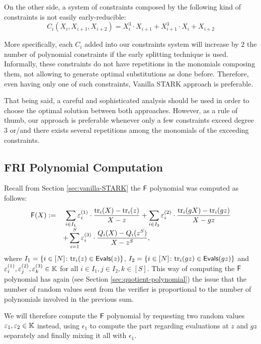 \begin{example}
On the other side, a system of constraints composed by the following kind of constraints is not easily early-reducible:
\[
C_i(X_i, X_{i+1}, X_{i+2}) = X_i^3 \cdot X_{i+1} + X_{i+1}^3 \cdot X_i + X_{i+2}
\]

More specifically, each $C_i$ added into our constraints system will increase by $2$ the number of polynomial constraints if the early splitting technique is used. Informally, these constraints do not have repetitions in the monomials composing them, not allowing to generate optimal substitutions as done before. Therefore, even having only one of such constraints, Vanilla STARK approach is preferable.

That being said, a careful and sophisticated analysis should be used in order to choose the optimal solution between both approaches. However, as a rule of thumb, our approach is preferable whenever only a few constraints exceed degree $3$ or/and there exists several repetitions among the monomials of the exceeding constraints.
 \end{example} 


\subsection{FRI Polynomial Computation}\label{sec:computing-polynomials}

Recall from Section \ref{sec:vanilla-STARK} the $\textsf{F}$ polynomial was computed as follows:
\begin{align*}
\begin{array}{rl}
\textsf{F}(X) := &\displaystyle~\sum_{i \in I_1} \varepsilon^{(1)}_i \cdot \frac{\text{tr}_i(X) - \text{tr}_i(z)}{X - z} + \sum_{i \in I_2} \varepsilon^{(2)}_i \cdot \frac{\text{tr}_i(gX) - \text{tr}_i(gz)}{X - gz} \\[0.2cm]
  &\displaystyle + \sum_{i=1}^S \varepsilon^{(3)}_i \cdot \frac{Q_i(X) - Q_i(z^S)}{X - z^S},
\end{array}
\end{align*}
where $I_1 = \{i \in [N] \colon \text{tr}_i(z) \in \textsf{Evals}(z)\}$, $I_2 = \{i \in [N] \colon \text{tr}_i(gz) \in \textsf{Evals}(gz)\}$ and $\varepsilon^{(1)}_i,\varepsilon^{(2)}_j,\varepsilon^{(3)}_k \in \mathbb{K}$ for all $i \in I_1,j\in I_2, k\in[S]$. This way of computing the $\textsf{F}$ polynomial has again (see Section \ref{sec:quotient-polynomial}) the issue that the number of random values sent from the verifier is proportional to the number of polynomials involved in the previous sum.

We will therefore compute the $\textsf{F}$ polynomial by requesting two random values $\varepsilon_1,\varepsilon_2 \in \mathbb{K}$ instead, using $\epsilon_1$ to compute the part regarding evaluations at $z$ and $gz$ separately and finally mixing it all with $\epsilon_1$.


